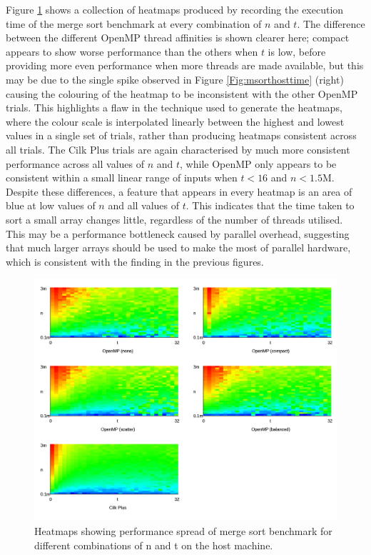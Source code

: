 \documentclass{report}
\begin{document}
Figure \ref{Fig:msorthostheatmap} shows a collection of heatmaps produced by recording the execution time of the merge sort benchmark at every combination of \(n\) and \(t\). The difference between the different OpenMP thread affinities is shown clearer here; compact appears to show worse performance than the others when \(t\) is low, before providing more even performance when more threads are made available, but this may be due to the single spike observed in Figure \ref{Fig:msorthosttime} (right) causing the colouring of the heatmap to be inconsistent with the other OpenMP trials. This highlights a flaw in the technique used to generate the heatmaps, where the colour scale is interpolated linearly between the highest and lowest values in a single set of trials, rather than producing heatmaps consistent across all trials. The Cilk Plus trials are again characterised by much more consistent performance across all values of \(n\) and \(t\), while OpenMP only appears to be consistent within a small linear range of inputs when \(t<16\) and \(n<1.5\)M. Despite these differences, a feature that appears in every heatmap is an area of blue at low values of \(n\) and all values of \(t\). This indicates that the time taken to sort a small array changes little, regardless of the number of threads utilised. This may be a performance bottleneck caused by parallel overhead, suggesting that much larger arrays should be used to make the most of parallel hardware, which is consistent with the finding in the previous figures.
\noindent
\begin{figure}[t!]
	\includegraphics[width=\linewidth]{../../heatmaps/intel64/msort}
	\caption{Heatmaps showing performance spread of merge sort benchmark for different combinations of n and t on the host machine.}
	\label{Fig:msorthostheatmap}
\end{figure}
\end{document}
